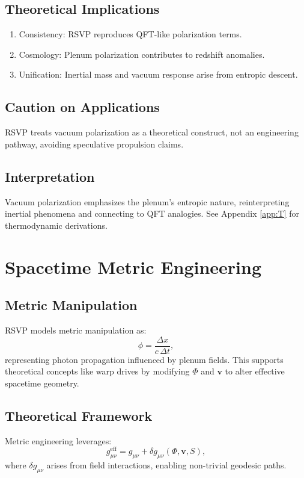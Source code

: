 \documentclass[12pt]{report}
\begin{document}
\section{Theoretical Implications}
\begin{enumerate}
    \item Consistency: RSVP reproduces QFT-like polarization terms.
    \item Cosmology: Plenum polarization contributes to redshift anomalies.
    \item Unification: Inertial mass and vacuum response arise from entropic descent.
\end{enumerate}

\section{Caution on Applications}
RSVP treats vacuum polarization as a theoretical construct, not an engineering pathway, avoiding speculative propulsion claims.

\section{Interpretation}
Vacuum polarization emphasizes the plenum’s entropic nature, reinterpreting inertial phenomena and connecting to QFT analogies. See Appendix \ref{app:T} for thermodynamic derivations.

\chapter{Spacetime Metric Engineering}
\label{app:BB}
\section{Metric Manipulation}
RSVP models metric manipulation as:
\begin{equation}
\phi = \frac{\Delta x}{c \, \Delta t}, \label{eq:photon}
\end{equation}
representing photon propagation influenced by plenum fields. This supports theoretical concepts like warp drives by modifying \(\Phi\) and \(\mathbf{v}\) to alter effective spacetime geometry.

\section{Theoretical Framework}
Metric engineering leverages:
\[
g_{\mu\nu}^{\text{eff}} = g_{\mu\nu} + \delta g_{\mu\nu}(\Phi, \mathbf{v}, S),
\]
where \(\delta g_{\mu\nu}\) arises from field interactions, enabling non-trivial geodesic paths.
\end{document}
